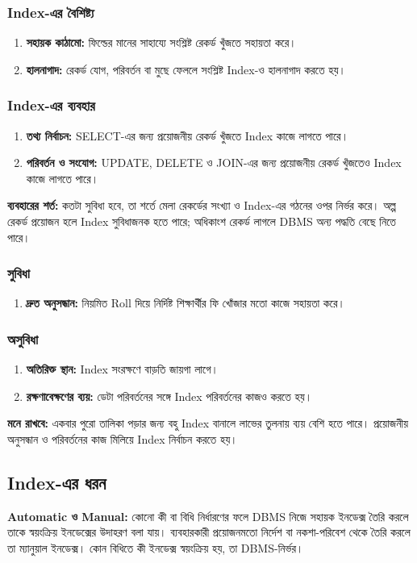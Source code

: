 \subsubsection{Index-এর বৈশিষ্ট্য}
\begin{enumerate}
\item \textbf{সহায়ক কাঠামো:} ফিল্ডের মানের সাহায্যে সংশ্লিষ্ট রেকর্ড খুঁজতে সহায়তা করে।
\item \textbf{হালনাগাদ:} রেকর্ড যোগ, পরিবর্তন বা মুছে ফেললে সংশ্লিষ্ট Index-ও হালনাগাদ করতে হয়।
\end{enumerate}
\subsubsection{Index-এর ব্যবহার}
\begin{enumerate}
\item \textbf{তথ্য নির্বাচন:} SELECT-এর জন্য প্রয়োজনীয় রেকর্ড খুঁজতে Index কাজে লাগতে পারে।
\item \textbf{পরিবর্তন ও সংযোগ:} UPDATE, DELETE ও JOIN-এর জন্য প্রয়োজনীয় রেকর্ড খুঁজতেও Index কাজে লাগতে পারে।
\end{enumerate}
\textbf{ব্যবহারের শর্ত:} কতটা সুবিধা হবে, তা শর্তে মেলা রেকর্ডের সংখ্যা ও Index-এর গঠনের ওপর নির্ভর করে। অল্প রেকর্ড প্রয়োজন হলে Index সুবিধাজনক হতে পারে; অধিকাংশ রেকর্ড লাগলে DBMS অন্য পদ্ধতি বেছে নিতে পারে।
\subsubsection{সুবিধা}
\begin{enumerate}
\item \textbf{দ্রুত অনুসন্ধান:} নিয়মিত Roll দিয়ে নির্দিষ্ট শিক্ষার্থীর ফি খোঁজার মতো কাজে সহায়তা করে।
\end{enumerate}
\subsubsection{অসুবিধা}
\begin{enumerate}
\item \textbf{অতিরিক্ত স্থান:} Index সংরক্ষণে বাড়তি জায়গা লাগে।
\item \textbf{রক্ষণাবেক্ষণের ব্যয়:} ডেটা পরিবর্তনের সঙ্গে Index পরিবর্তনের কাজও করতে হয়।
\end{enumerate}
\textbf{মনে রাখবে:} একবার পুরো তালিকা পড়ার জন্য বহু Index বানালে লাভের তুলনায় ব্যয় বেশি হতে পারে। প্রয়োজনীয় অনুসন্ধান ও পরিবর্তনের কাজ মিলিয়ে Index নির্বাচন করতে হয়।

\subsection{Index-এর ধরন}
\textbf{Automatic ও Manual:} কোনো কী বা বিধি নির্ধারণের ফলে DBMS নিজে সহায়ক ইনডেক্স তৈরি করলে তাকে স্বয়ংক্রিয় ইনডেক্সের উদাহরণ বলা যায়। ব্যবহারকারী প্রয়োজনমতো নির্দেশ বা নকশা-পরিবেশ থেকে তৈরি করলে তা ম্যানুয়াল ইনডেক্স। কোন বিধিতে কী ইনডেক্স স্বয়ংক্রিয় হয়, তা DBMS-নির্ভর।

